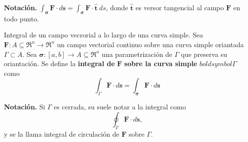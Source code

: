 \textbf{Notaci\'on.} $\int_{\boldsymbol{\sigma}}\mathbf{F}\cdot d\mathbf{s}=\int_{\boldsymbol{\sigma}}\mathbf{F}\cdot\hat{\mathbf{t}}\:ds$, donde $\hat{\mathbf{t}}$ es versor tangencial al campo $\mathbf{F}$ en todo punto.

\begin{definition}
    Integral de un campo vecrorial a lo largo de una curva simple.
    Sea $\mathbf{F}:A\subseteq\Re^n\to\Re^n$ un campo vectorial continuo sobre una curva simple oriantada $\Gamma\subset A$. Sea $\boldsymbol{\sigma}:[a,b]\to A\subseteq\Re^n$ una parametrizaci\'on de $\Gamma$ que preserva su oriantaci\'on. Se define la \textbf{integral de} $\mathbf{F}$ \textbf{sobre la curva simple} $boldsymbol{\Gamma}$ como
    \[
        \int_{\Gamma}\mathbf{F}\cdot d\mathbf{s}=\int_{\boldsymbol{\sigma}}\mathbf{F}\cdot d\mathbf{s}  
    \]
\end{definition}

\textbf{Notaci\'on.} Si $\Gamma$ es cerrada, su suele notar a la integral como
\[
    \oint_{\Gamma}\mathbf{F}\cdot d\mathbf{s},  
\]
y se la llama integral de circulaci\'on de $\mathbf{F}$ sobre $\Gamma$.
